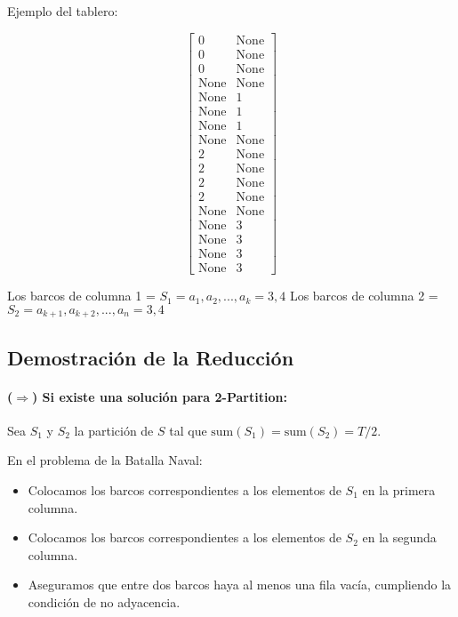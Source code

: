 \vskip0.25cm

Ejemplo del tablero: 

\begin{center}
\[
    \begin{bmatrix}
    0 & \text{None} \\
    0 & \text{None} \\
    0 & \text{None} \\
    \text{None} & \text{None} \\
    \text{None} & 1 \\
    \text{None} & 1 \\
    \text{None} & 1 \\
    \text{None} & \text{None} \\
    2 & \text{None} \\
    2 & \text{None} \\
    2 & \text{None} \\
    2 & \text{None} \\
    \text{None} & \text{None} \\
    \text{None} & 3 \\
    \text{None} & 3 \\
    \text{None} & 3 \\
    \text{None} & 3
    \end{bmatrix}
\]
\end{center}

Los barcos de columna 1 = $S_{1} = {a_{1}, a_{2},...,a_{k}} = {3, 4}$ 
Los barcos de columna 2 = $S_{2} = {a_{k +1}, a_{k + 2},..., a_{n}} = {3, 4}$

\subsection*{Demostración de la Reducción}

\paragraph{($\Rightarrow$) Si existe una solución para 2-Partition:}  

Sea $S_1$ y $S_2$ la partición de $S$ tal que $\text{sum}(S_1) = \text{sum}(S_2) = T / 2$.  

En el problema de la Batalla Naval:

\begin{itemize}
    \item Colocamos los barcos correspondientes a los elementos de $S_1$ en la primera columna.
    \item Colocamos los barcos correspondientes a los elementos de $S_2$ en la segunda columna.
    \item Aseguramos que entre dos barcos haya al menos una fila vacía, cumpliendo la condición de no adyacencia.
\end{itemize}

